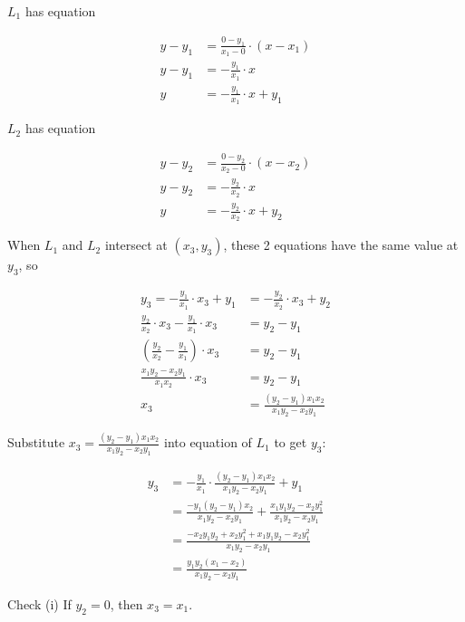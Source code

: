 \documentclass[9pt]{article}
\begin{document}
$L_1$ has equation

\begin{align*}
  y - y_1 &= \frac{0 - y_1}{x_1 - 0} \cdot (x - x_1) \\
  y - y_1 &= -\frac{y_1}{x_1} \cdot x \\
  y &= -\frac{y_1}{x_1} \cdot x + y_1
\end{align*}

$L_2$ has equation

\begin{align*}
  y - y_2 &= \frac{0 - y_2}{x_2 - 0} \cdot (x - x_2) \\
  y - y_2 &= -\frac{y_2}{x_2} \cdot x \\
  y &= -\frac{y_2}{x_2} \cdot x + y_2
\end{align*}

When $L_1$ and $L_2$ intersect at $(x_3, y_3)$, these 2 equations have the same value at $y_3$, so

\begin{align*}
  y_3 = -\frac{y_1}{x_1} \cdot x_3 + y_1 &= -\frac{y_2}{x_2} \cdot x_3 + y_2 \\
  \frac{y_2}{x_2} \cdot x_3 - \frac{y_1}{x_1} \cdot x_3 &= y_2 - y_1 \\
  (\frac{y_2}{x_2} - \frac{y_1}{x_1}) \cdot x_3 &= y_2 - y_1 \\
  \frac{x_1 y_2 - x_2 y_1}{x_1 x_2} \cdot x_3  &= y_2 - y_1 \\
  x_3 &= \frac{(y_2 - y_1) x_1 x_2}{x_1 y_2 - x_2 y_1} \tag*{(Assuming $x_1 y_2 \neq x_2 y_1$)}
\end{align*}

Substitute $x_3 = \frac{(y_2 - y_1) x_1 x_2}{x_1 y_2 - x_2 y_1}$ into equation of $L_1$ to get $y_3$:

\begin{align*}
  y_3 &= -\frac{y_1}{x_1} \cdot \frac{(y_2 - y_1) x_1 x_2}{x_1 y_2 - x_2 y_1} + y_1 \\
      &= \frac{-y_1 (y_2 - y_1) x_2}{x_1 y_2 - x_2 y_1} + \frac{x_1 y_1 y_2 - x_2 y_1^2}{x_1 y_2 - x_2 y_1} \\
      &= \frac{-x_2 y_1 y_2 + x_2 y_1^2 + x_1 y_1 y_2 - x_2 y_1^2}{x_1 y_2 - x_2 y_1} \\
      &= \frac{y_1 y_2 (x_1 - x_2)}{x_1 y_2 - x_2 y_1}
\end{align*}

\begin{tcolorbox}
  Check (i) If $y_2 = 0$, then $x_3 = x_1$.
\end{tcolorbox}
\end{document}
